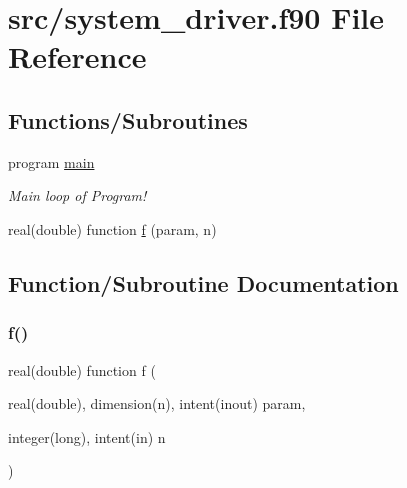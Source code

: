 \hypertarget{src_2system__driver_8f90}{}\section{src/system\+\_\+driver.f90 File Reference}
\label{src_2system__driver_8f90}
\subsection*{Functions/\+Subroutines}
\begin{DoxyCompactItemize}
\item 
program \hyperlink{src_2system__driver_8f90_a8ec2266d83cd6c0b762cbcbc92c0af3d}{main}
\begin{DoxyCompactList}\small\item\em Main loop of Program! \end{DoxyCompactList}\item 
real(double) function \hyperlink{src_2system__driver_8f90_aa2135d8f316dac80d3d2ba872771b95b}{f} (param, n)
\end{DoxyCompactItemize}


\subsection{Function/\+Subroutine Documentation}
\mbox{\label{src_2system__driver_8f90_aa2135d8f316dac80d3d2ba872771b95b}} 
\subsubsection{\texorpdfstring{f()}{f()}}
{\footnotesize\ttfamily real(double) function f (\begin{DoxyParamCaption}\item[{real(double), dimension(n), intent(inout)}]{param,  }\item[{integer(long), intent(in)}]{n }\end{DoxyParamCaption})}

